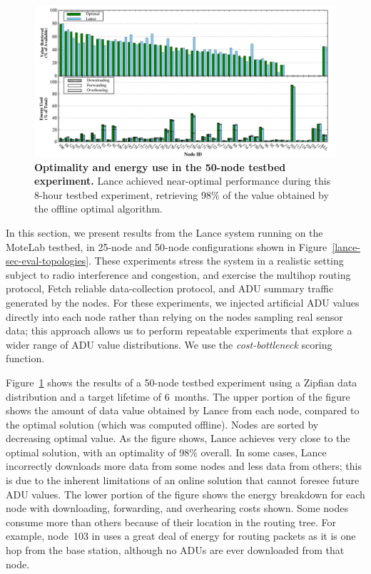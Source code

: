 \begin{figure}[t]
\label{lance-sec-eval-figvolcano}
\begin{center}
\includegraphics[width=1.0\hsize]{./6-lance/figs/gwa/big/FIGURE.pdf}
\end{center}
\caption{\textbf{Optimality and energy use in the 50-node testbed
experiment.}
Lance achieved near-optimal performance during this 8-hour testbed
experiment, retrieving 98\% of the value obtained by the offline optimal
algorithm.}
\end{figure}

In this section, we present results from the Lance system running on the
MoteLab testbed, in 25-node and 50-node configurations shown in
Figure~\ref{lance-sec-eval-topologies}. These experiments stress the system
in a realistic setting subject to radio interference and congestion, and
exercise the multihop routing protocol, Fetch reliable data-collection
protocol, and ADU summary traffic generated by the nodes. For these
experiments, we injected artificial ADU values directly into each node rather
than relying on the nodes sampling real sensor data; this approach allows us
to perform repeatable experiments that explore a wider range of ADU value
distributions.  We use the \emph{cost-bottleneck} scoring function. 

Figure~\ref{lance-sec-eval-figvolcano} shows the results of a 50-node testbed
experiment using a Zipfian data distribution and a target lifetime of
6~months.  The upper portion of the figure shows the amount of data value
obtained by Lance from each node, compared to the optimal solution (which was
computed offline). Nodes are sorted by decreasing optimal value. As the
figure shows, Lance achieves very close to the optimal solution, with an
optimality of 98\% overall.  In some cases, Lance incorrectly downloads more
data from some nodes and less data from others; this is due to the inherent
limitations of an online solution that cannot foresee future ADU values.  The
lower portion of the figure shows the energy breakdown for each node with
downloading, forwarding, and overhearing costs shown.  Some nodes consume
more than others because of their location in the routing tree. For example,
node~103 in uses a great deal of energy for routing packets as it is one hop
from the base station, although no ADUs are ever downloaded from that node.


